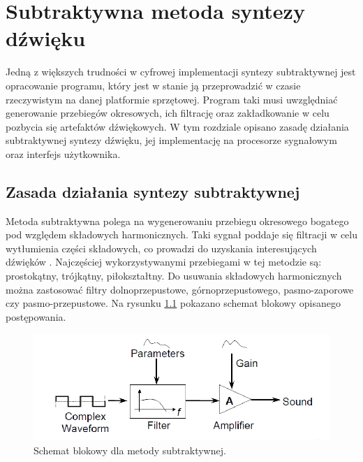 \chapter{Subtraktywna metoda syntezy dźwięku}\label{chapter_subtractive}
Jedną z większych trudności w cyfrowej implementacji syntezy subtraktywnej jest opracowanie programu, który jest w stanie ją przeprowadzić w czasie rzeczywistym na danej platformie sprzętowej. Program taki musi uwzględniać generowanie przebiegów okresowych, ich filtrację oraz zakładkowanie w celu pozbycia się artefaktów dźwiękowych. W tym rozdziale opisano zasadę działania subtraktywnej syntezy dźwięku, jej implementację na procesorze sygnałowym oraz interfejs użytkownika.
\section{Zasada działania syntezy subtraktywnej}
Metoda subtraktywna polega na wygenerowaniu przebiegu okresowego bogatego pod względem składowych harmonicznych. Taki sygnał poddaje się filtracji w celu wytłumienia części składowych, co prowadzi do uzyskania interesujących dźwięków \cite{alles}. Najczęściej wykorzystywanymi przebiegami w tej metodzie są: prostokątny, trójkątny, piłokształtny. Do usuwania składowych harmonicznych można zastosować filtry dolnoprzepustowe, górnoprzepustowego, pasmo-zaporowe czy pasmo-przepustowe. Na rysunku \ref{rys:sub_diagram} pokazano schemat blokowy opisanego postępowania.

\begin{figure}[H]
	\centering
	\includegraphics[width=12cm]{grafiki/sub_diagram}
	\captionsetup{justification=centering}
	\caption{Schemat blokowy dla metody subtraktywnej.}
	\label{rys:sub_diagram}
\end{figure}


